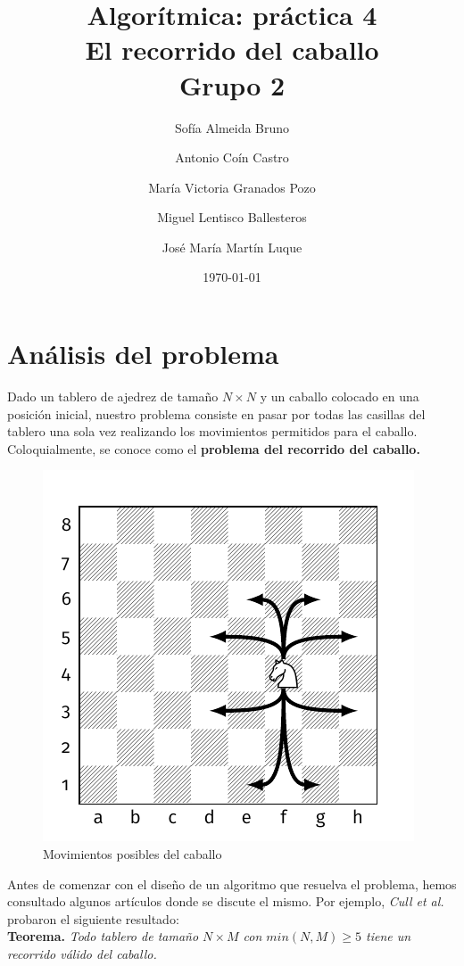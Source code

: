 \documentclass[11pt]{article}
\title{Algorítmica: práctica 4 \\ \large El recorrido del caballo\\ \vspace{0.2em}Grupo 2}
\author{Sofía Almeida Bruno \and Antonio Coín Castro \and María Victoria Granados Pozo \and Miguel Lentisco Ballesteros \and José María Martín Luque}
\date{\today}
\begin{document}
\maketitle

\newpage

\section*{Análisis del problema}

Dado un tablero de ajedrez de tamaño $N\times N$ y un caballo colocado en una posición inicial, nuestro problema consiste en pasar por todas las casillas del tablero una sola vez realizando los movimientos permitidos para el caballo. Coloquialmente, se conoce como el \textbf{problema del recorrido del caballo.}

\begin{figure}[H]
  \centering
  \includegraphics{./img/tablero1.pdf}
  \caption{Movimientos posibles del caballo}
  \label{}
\end{figure}

Antes de comenzar con el diseño de un algoritmo que resuelva el problema, hemos consultado algunos artículos donde se discute el mismo. Por ejemplo, \textit{Cull et al.} \cite{cull} probaron el siguiente resultado:\\

\textbf{Teorema.} \textit{Todo tablero de tamaño $N\times M$ con $	min(N,M)\ge5$ tiene un recorrido válido del caballo.}\\
\end{document}
